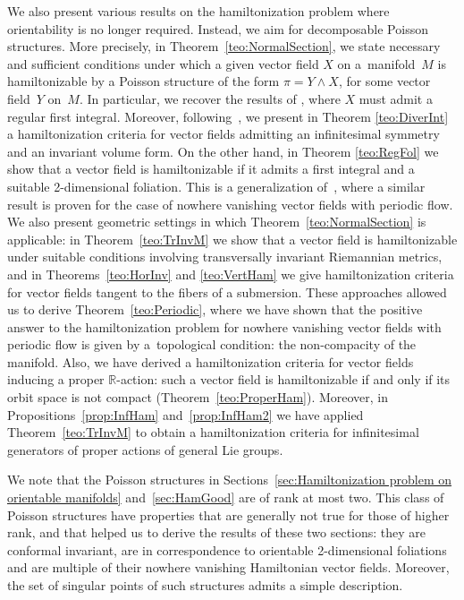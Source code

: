 \documentclass[pdftex]{sigma}%
\numberwithin{equation}{section}
\begin{document}
We also present various results on the hamiltonization problem where orientability is no longer required. Instead, we aim for decomposable Poisson structures. More precisely, in Theorem~\ref{teo:NormalSection}, we state necessary and sufficient conditions under which a given vector field $X$ on a~manifold~$M$ is hamiltonizable by a Poisson structure of the form $\pi = Y \wedge X$, for some vector field~$Y$ on~$M$. In particular, we recover the results of \cite{AHA-06,Hojman-96}, where $X$ must admit a regular first integral.
Moreover, following~\cite{LPS-12}, we present in Theorem \ref{teo:DiverInt} a hamiltonization criteria for vector fields admitting an infinitesimal symmetry and an invariant volume form. On the other hand, in Theorem \ref{teo:RegFol} we show that a vector field is hamiltonizable if it admits a first integral and a suitable 2-dimensional foliation. This is a generalization of~\cite[Theorem~2]{FGS-05}, where a similar result is proven for the case of nowhere vanishing vector fields with periodic flow. We also present geometric settings in which Theorem~\ref{teo:NormalSection} is applicable: in Theorem~\ref{teo:TrInvM} we show that a vector field is hamiltonizable under suitable conditions involving transversally invariant Riemannian metrics, and in Theorems~\ref{teo:HorInv} and \ref{teo:VertHam} we give hamiltonization criteria for vector fields tangent to the fibers of a submersion. These approaches allowed us to derive Theorem~\ref{teo:Periodic}, where we have shown that the positive answer to the hamiltonization problem for nowhere vanishing vector fields with periodic flow is given by a~topological condition: the non-compacity of the manifold. Also, we have derived a hamiltonization criteria for vector fields inducing a proper $\mathbb{R}$-action: such a vector field is hamiltonizable if and only if its orbit space is not compact (Theorem~\ref{teo:ProperHam}). Moreover, in Propositions~\ref{prop:InfHam} and~\ref{prop:InfHam2} we have applied Theorem~\ref{teo:TrInvM} to obtain a hamiltonization criteria for infinitesimal generators of proper actions of general Lie groups.

We note that the Poisson structures in Sections~\ref{sec:Hamiltonization problem on orientable manifolds} and~\ref{sec:HamGood} are of rank at most two. This class of Poisson structures have properties that are generally not true for those of higher rank, and that helped us to derive the results of these two sections: they are conformal invariant, are in correspondence to orientable 2-dimensional foliations and are multiple of their nowhere vanishing Hamiltonian vector fields. Moreover, the set of singular points of such structures admits a simple description.
\end{document}
